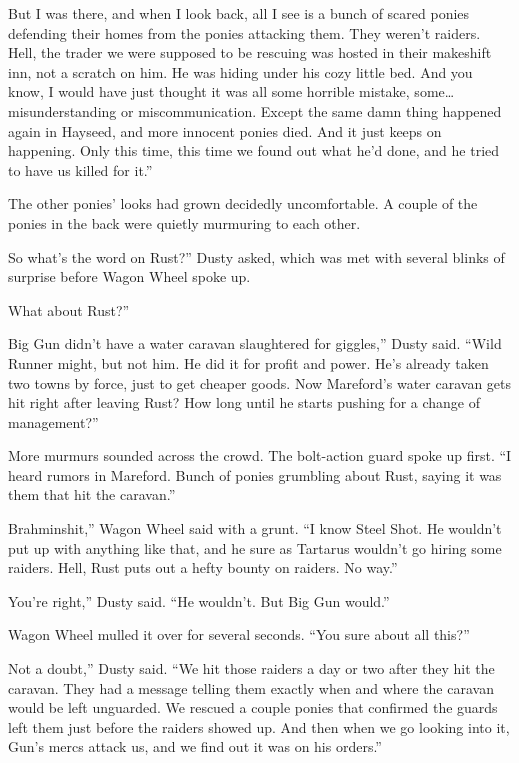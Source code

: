 \leavevmode{}But I was there, and when I look back, all I see is a bunch of scared ponies defending their homes from the ponies attacking them. They weren’t raiders. Hell, the trader we were supposed to be rescuing was hosted in their makeshift inn, not a scratch on him. He was hiding under his cozy little bed. And you know, I would have just thought it was all some horrible mistake, some… misunderstanding or miscommunication. Except the same damn thing happened again in Hayseed, and more innocent ponies died. And it just keeps on happening. Only this time, this time we found out what he’d done, and he tried to have us killed for it.”

The other ponies’ looks had grown decidedly uncomfortable. A couple of the ponies in the back were quietly murmuring to each other.

\leavevmode{}So what’s the word on Rust?” Dusty asked, which was met with several blinks of surprise before Wagon Wheel spoke up.

\leavevmode{}What about Rust?”

\leavevmode{}Big Gun didn’t have a water caravan slaughtered for giggles,” Dusty said. “Wild Runner might, but not him. He did it for profit and power. He’s already taken two towns by force, just to get cheaper goods. Now Mareford’s water caravan gets hit right after leaving Rust? How long until he starts pushing for a change of management?”

More murmurs sounded across the crowd. The bolt-action guard spoke up first. “I heard rumors in Mareford. Bunch of ponies grumbling about Rust, saying it was them that hit the caravan.”

\leavevmode{}Brahminshit,” Wagon Wheel said with a grunt. “I know Steel Shot. He wouldn’t put up with anything like that, and he sure as Tartarus wouldn’t go hiring some raiders. Hell, Rust puts out a hefty bounty on raiders. No way.”

\leavevmode{}You’re right,” Dusty said. “He wouldn’t. But Big Gun would.”

Wagon Wheel mulled it over for several seconds. “You sure about all this?”

\leavevmode{}Not a doubt,” Dusty said. “We hit those raiders a day or two after they hit the caravan. They had a message telling them exactly when and where the caravan would be left unguarded. We rescued a couple ponies that confirmed the guards left them just before the raiders showed up. And then when we go looking into it, Gun’s mercs attack us, and we find out it was on his orders.”

